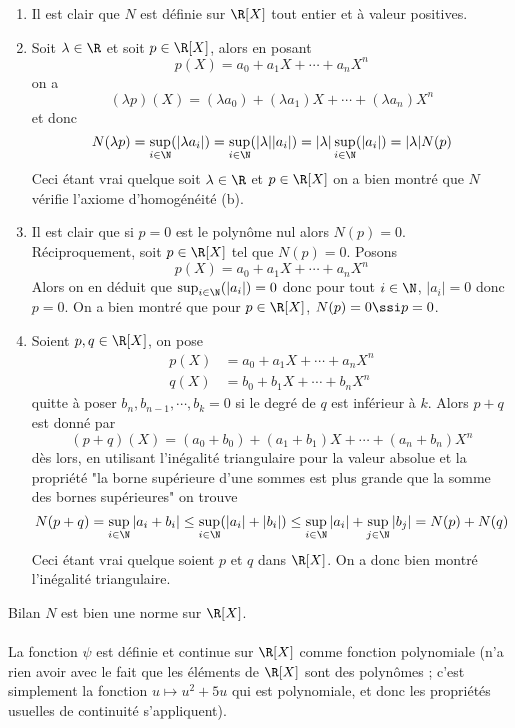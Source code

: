 \documentclass{article}
\begin{document}
\begin{enumerate}[{\bf (a)}]
\item Il est clair que $N$ est définie sur $\R[X]$ tout entier et à valeur positives.
\item Soit $\lambda \in \R$ et soit $p \in \R[X]$, alors en posant
\[
p(X) = a_0 + a_1X + \cdots + a_n X^n
\]
on a
\[
(\lambda p)(X) = (\lambda a_0) + (\lambda a_1)X + \cdots + (\lambda a_n) X^n
\]
et donc \[
N(\lambda p) = \sup_{i\in \N}( \vert \lambda a_i \vert) = \sup_{i\in \N}( \vert \lambda \vert \vert a_i \vert) = \vert \lambda \vert \sup_{i\in \N}(  \vert a_i \vert) = \vert \lambda \vert N(p)
\]
Ceci étant vrai quelque soit $\lambda \in \R$ et $p \in \R[X]$ on a bien montré que $N$ vérifie l'axiome d'homogénéité (b).
\item Il est clair que si $p =0$ est le polynôme nul alors $N(p) = 0$. Réciproquement, soit $p \in \R[X]$ tel que $N(p) = 0$. Posons 
\[
p(X) = a_0 + a_1X + \cdots + a_n X^n
\]
Alors on en déduit que $\sup_{i\in \N}( \vert a_i \vert) = 0$ donc pour tout $i \in \N$, $\vert a_i \vert  = 0$ donc $p = 0$.
On a bien montré que pour $p \in \R[X]$, $N(p) = 0 \ssi p = 0$.
\item Soient $p,q \in \R[X]$, on pose
\begin{align*}
p(X) &= a_0 + a_1X + \cdots + a_n X^n\\
q(X) &= b_0 + b_1X + \cdots + b_n X^n
\end{align*}
quitte à poser $b_n, b_{n-1}, \cdots, b_k = 0$ si le degré de $q$ est inférieur à $k$.
Alors $p+q$ est donné par
\[
(p+q)(X) = (a_0+b_0) + (a_1+b_1)X + \cdots + (a_n+b_n) X^n
\]
dès lors, en utilisant l'inégalité triangulaire pour la valeur absolue et la propriété "la borne supérieure d'une sommes est plus grande que la somme des bornes supérieures" on trouve
\[
N(p+q) = \sup_{i \in \N} \vert a_i + b_i \vert \leq \sup_{i \in \N} (\vert a_i \vert  + \vert b_i \vert ) \leq \sup_{i \in \N}\vert a_i \vert  + \sup_{j \in \N}\vert b_j \vert = N(p) + N(q)
\]
Ceci étant vrai quelque soient $p$ et $q$ dans $\R[X]$. On a donc bien montré l'inégalité triangulaire.
\end{enumerate}

Bilan $N$ est bien une norme sur $\R[X]$.

\paragraph{}
La fonction $\psi$ est définie et continue sur $\R[X]$ comme fonction polynomiale (n'a rien avoir avec le fait que les éléments de $\R[X]$ sont des polynômes ; c'est simplement la fonction $u \mapsto u^2 + 5u$ qui est polynomiale, et donc les propriétés usuelles de continuité s'appliquent).
\end{document}
